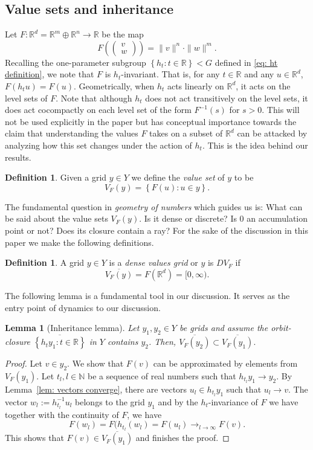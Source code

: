 \documentclass[reqno,11pt, twoside]{amsart}
\theoremstyle{plain}
\newtheorem{lem}[thm]{Lemma}
\theoremstyle{definition}
\newtheorem{defn}[thm]{Definition}
\theoremstyle{definition}
\theoremstyle{remark}
\numberwithin{equation}{section}
\newcommand{\ignore}[1]{{}}
\newcommand{\bR}{\mathbb{R}}
\newcommand{\bN}{\mathbb{N}}
\newcommand\norm[1]{\|#1\|}
\newcommand\seta[1]{\left\{#1\right\}}
\newcommand\pa[1]{\left(#1\right)}
\newcommand\mat[1]{\pa{\begin{matrix}#1\end{matrix}}}
\begin{document}
\subsection{Value sets and inheritance}
\label{sec: VF and inheritance}
Let $F:\bR^d=\bR^m\oplus \bR^n\to \bR$ be the map
$$F(\mat{v\\w}) = \norm{v}^n\cdot\norm{w}^m.$$ 
Recalling the one-parameter subgroup $\seta{h_t:t\in \bR}<G$ defined in
\eqref{eq: ht definition}, we note that $F$ is $h_t$-invariant. 
That is, for any $t\in \bR$ and any $u\in \bR^d$, $F(h_tu)=F(u)$. Geometrically, when $h_t$ acts linearly on $\bR^d$, it acts on the level sets of $F$. Note that although $h_t$ does not act transitively on the level sets, it does act cocompactly on each level set of the form $F^{-1}(s)$ for $s>0$. This will not be used explicitly in the paper but has conceptual importance 
towards the claim that understanding the values $F$ takes on a subset of $\bR^d$ can be attacked by analyzing how this set changes under the action of $h_t$. This is the idea behind our results.  
\begin{defn}\label{def: value set}
Given a grid $y\in Y$ we define the \textit{value set} of $y$ to be
$$V_F(y)=\seta{F(u):u\in y}.$$
\end{defn}
The fundamental question in \textit{geometry of numbers} which guides us
is: What can be said about the value sets $V_F(y)$. Is it dense or discrete? Is $0$ an accumulation point or not? Does its closure contain a ray? 
For the sake of the discussion in this paper we make the following definitions.  
\begin{defn}\label{defn: DVF}
    A grid $y\in Y$ is a \textit{dense values grid} or $y$ is $DV_F$ 
    if $$\overline{V_F(y)}= F(\bR^d) = [0,\infty).$$
\end{defn}
The following lemma is a fundamental tool in our discussion. It serves 
as the entry point of dynamics to our discussion.
\begin{lem}[Inheritance lemma]\label{lem: inheritance}
Let $y_1,y_2\in Y$ be grids and assume  the orbit-closure $\overline{\seta{h_ty_1:t\in \bR}}$ in $Y$ contains $y_2$. Then, 
$\overline{V_F(y_2)}\subset \overline{V_F(y_1)}.$  
\ignore{
Also, if $\overline{\seta{h_ty_1:t\in \bR}}$ contains a coset of a $d-1$-dimensional 
subtorus in a fiber, then $y_1$ is $DV_F$.
}
\end{lem}
\begin{proof}
    Let $v\in y_2$. We show that $F(v)$ can be approximated by elements from 
    $V_F(y_1)$. 
    Let $t_l, l\in \bN$ be a sequence of real numbers such that $h_{t_l}y_1\to y_2$. By Lemma~\ref{lem: vectors converge}, there are vectors $u_l\in h_{t_l}y_1 $ such that $u_l\to v$. The vector $w_l:=h_{t_l}^{-1}u_l$ belongs to the grid $y_1$ and by the $h_t$-invariance of $F$ we have 
    together with the continuity of $F$, we have
    $$F(w_l) = F(h_{t_l}(w_l)=F(u_l)\to_{l\to\infty} F(v).$$
    This shows that $F(v)\in \overline{V_F(y_1)}$ and finishes the proof. 
\end{proof}
\end{document}
